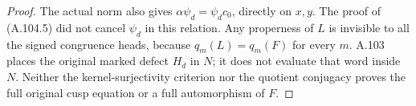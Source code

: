 \begin{proof}
The actual norm also gives
\(\alpha\psi_d=\psi_dc_0\), directly on \(x,y\).
The proof of (A.104.5) did not cancel \(\psi_d\) in this relation.
Any properness of \(L\) is invisible to all the signed congruence
heads, because \(q_m(L)=q_m(F)\) for every \(m\).
A.103 places the original marked defect \(H_d\) in \(N\);
it does not evaluate that word inside \(N\).
Neither the kernel-surjectivity criterion nor the quotient
conjugacy proves the full original cusp equation or a full
automorphism of \(F\).
\end{proof}
